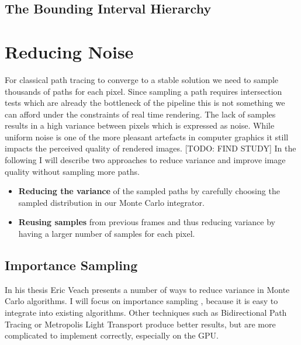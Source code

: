 \documentclass{ACGSeminar}
\begin{document}
\subsection{The Bounding Interval Hierarchy} 
\cite{waechter06}

\section{Reducing Noise} \label{noise}
For classical path tracing to converge to a stable solution we need to sample thousands of paths for each pixel. Since sampling a path requires intersection tests which are already the bottleneck of the pipeline this is not something we can afford under the constraints of real time rendering. The lack of samples results in a high variance between pixels which is expressed as noise. While uniform noise is one of the more pleasant artefacts in computer graphics it still impacts the perceived quality of rendered images. [TODO: FIND STUDY]
In the following I will describe two approaches to reduce variance and improve image quality without sampling more paths.
\begin{itemize}
\item \textbf{Reducing the variance} of the sampled paths by carefully choosing the sampled distribution in our Monte Carlo integrator.
\item \textbf{Reusing samples} from previous frames and thus reducing variance by having a larger number of samples for each pixel.
\end{itemize}

\subsection{Importance Sampling}
In his thesis Eric Veach presents a number of ways to reduce variance in Monte Carlo algorithms. \cite[45--70]{veach1997robust} I will focus on importance sampling \cite[47--48]{veach1997robust}, because it is easy to integrate into existing algorithms. Other techniques such as Bidirectional Path Tracing or Metropolis Light Transport produce better results, but are more complicated to implement correctly, especially on the GPU.
\end{document}
